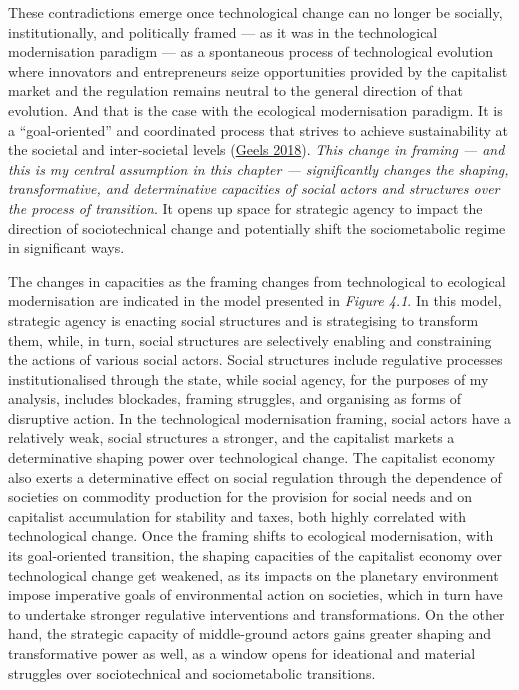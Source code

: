 \documentclass[a4paper, nobind]{templates/ociamthesis}
\begin{document}
These contradictions emerge once technological change can no longer be socially, institutionally, and politically framed --- as it was in the technological modernisation paradigm --- as a spontaneous process of technological evolution where innovators and entrepreneurs seize opportunities provided by the capitalist market and the regulation remains neutral to the general direction of that evolution. And that is the case with the ecological modernisation paradigm. It is a ``goal-oriented'' and coordinated process that strives to achieve sustainability at the societal and inter-societal levels (\protect\hyperlink{ref-geels_disruption_2018}{Geels 2018}). \emph{This change in framing --- and this is my central assumption in this chapter --- significantly changes the shaping, transformative, and determinative capacities of social actors and structures over the process of transition}. It opens up space for strategic agency to impact the direction of sociotechnical change and potentially shift the sociometabolic regime in significant ways.

The changes in capacities as the framing changes from technological to ecological modernisation are indicated in the model presented in \emph{Figure 4.1}. In this model, strategic agency is enacting social structures and is strategising to transform them, while, in turn, social structures are selectively enabling and constraining the actions of various social actors. Social structures include regulative processes institutionalised through the state, while social agency, for the purposes of my analysis, includes blockades, framing struggles, and organising as forms of disruptive action. In the technological modernisation framing, social actors have a relatively weak, social structures a stronger, and the capitalist markets a determinative shaping power over technological change. The capitalist economy also exerts a determinative effect on social regulation through the dependence of societies on commodity production for the provision for social needs and on capitalist accumulation for stability and taxes, both highly correlated with technological change. Once the framing shifts to ecological modernisation, with its goal-oriented transition, the shaping capacities of the capitalist economy over technological change get weakened, as its impacts on the planetary environment impose imperative goals of environmental action on societies, which in turn have to undertake stronger regulative interventions and transformations. On the other hand, the strategic capacity of middle-ground actors gains greater shaping and transformative power as well, as a window opens for ideational and material struggles over sociotechnical and sociometabolic transitions.
\end{document}
